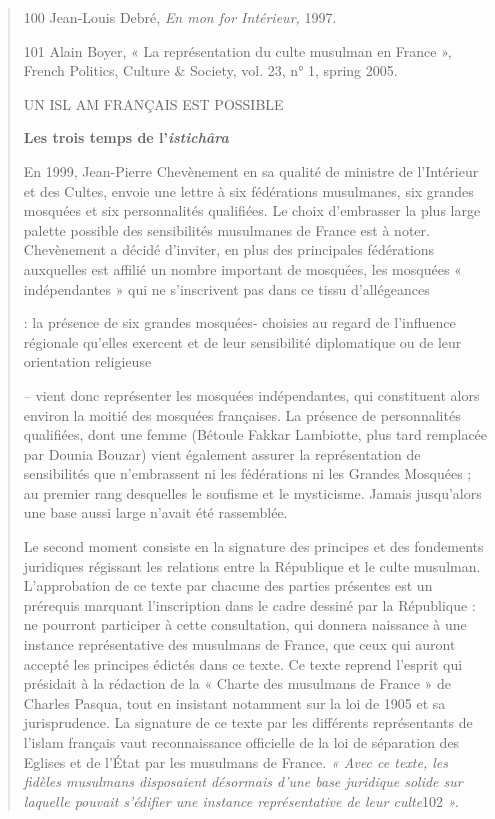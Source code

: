 \begin{quote}
100 Jean-Louis Debré, \emph{En mon for Intérieur,} 1997.

101 Alain Boyer, « La représentation du culte musulman en France »,
French Politics, Culture \& Society, vol. 23, n° 1, spring 2005.

UN ISL AM FRANÇAIS EST POSSIBLE

\textbf{Les trois temps de l'\emph{istichâra}}

En 1999, Jean-Pierre Chevènement en sa qualité de ministre de
l'Intérieur et des Cultes, envoie une lettre à six fédérations
musulmanes, six grandes mosquées et six personnalités qualifiées. Le
choix d'embrasser la plus large palette possible des sensibilités
musulmanes de France est à noter. Chevènement a décidé d'inviter, en
plus des principales fédérations auxquelles est affilié un nombre
important de mosquées, les mosquées « indépendantes » qui ne
s'inscrivent pas dans ce tissu d'allégeances

: la présence de six grandes mosquées- choisies au regard de l'influence
régionale qu'elles exercent et de leur sensibilité diplomatique ou de
leur orientation religieuse

-- vient donc représenter les mosquées indépendantes, qui constituent
alors environ la moitié des mosquées françaises. La présence de
personnalités qualifiées, dont une femme (Bétoule Fakkar Lambiotte, plus
tard remplacée par Dounia Bouzar) vient également assurer la
représentation de sensibilités que n'embrassent ni les fédérations ni
les Grandes Mosquées ; au premier rang desquelles le soufisme et le
mysticisme. Jamais jusqu'alors une base aussi large n'avait été
rassemblée.

Le second moment consiste en la signature des principes et des
fondements juridiques régissant les relations entre la République et le
culte musulman. L'approbation de ce texte par chacune des parties
présentes est un prérequis marquant l'inscription dans le cadre dessiné
par la République : ne pourront participer à cette consultation, qui
donnera naissance à une instance représentative des musulmans de France,
que ceux qui auront accepté les principes édictés dans ce texte. Ce
texte reprend l'esprit qui présidait à la rédaction de la « Charte des
musulmans de France » de Charles Pasqua, tout en insistant notamment sur
la loi de 1905 et sa jurisprudence. La signature de ce texte par les
différents représentants de l'islam français vaut reconnaissance
officielle de la loi de séparation des Eglises et de l'État par les
musulmans de France. \emph{« Avec ce texte, les fidèles musulmans
disposaient désormais d'une base juridique solide sur laquelle pouvait
s'édifier une instance représentative de leur culte}102 \emph{».}


\end{quote}
